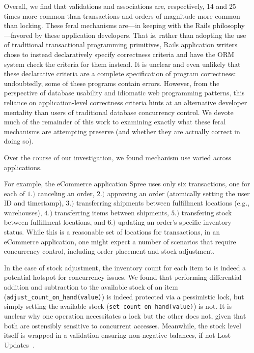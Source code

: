 Overall, we find that validations and associations are, respectively,
14 and 25 times more common than transactions and orders of magnitude
more common than locking. These feral mechanisms are---in keeping with
the Rails philosophy---favored by these application developers. That
is, rather than adopting the use of traditional transactional
programming primitives, Rails application writers chose to instead declaratively specify
correctness criteria and have the ORM system check the criteria for
them instead. It is unclear and even unlikely that these declarative
criteria are a complete specification of program correctness:
undoubtedly, some of these programs contain errors. However, from the
perspective of database usability and idiomatic web programming
patterns, this reliance on application-level correctness criteria
hints at an alternative developer mentality than users of traditional
database concurrency control.  We devote much of the remainder of this
work to examining exactly what these feral mechanisms are attempting
preserve (and whether they are actually correct in doing so).

 Over the course of our
investigation, we found mechanism use varied across applications.

For example, the eCommerce application Spree uses only
six transactions, one for each of $1.)$ canceling an order, $2.)$
approving an order (atomically setting the user ID and timestamp),
$3.)$ transferring shipments between fulfillment locations (e.g.,
warehouses), $4.)$ transferring items between shipments, $5.)$
transfering stock between fulfillment locations, and $6.)$ updating an
order's specific inventory status. While this is a reasonable set of
locations for transactions, in an eCommerce application, one might
expect a number of scenarios that require concurrency control,
including order placement and stock adjustment.

In the case of stock adjustment, the inventory count for each item to
is indeed a potential hotspot for concurrency issues. We found that
performing differential addition and subtraction to the available
stock of an item (\texttt{adjust\_count\_on\_hand(value)}) is indeed
protected via a pessimistic lock, but simply setting the available
stock (\texttt{set\_count\_on\_hand(value)}) is not. It is unclear why
one operation necessitates a lock but the other does not, given that
both are ostensibly sensitive to concurrent accesses. Meanwhile, the
stock level itself is wrapped in a validation ensuring non-negative
balances, if not Lost Updates~\cite{adya-isolation}.

